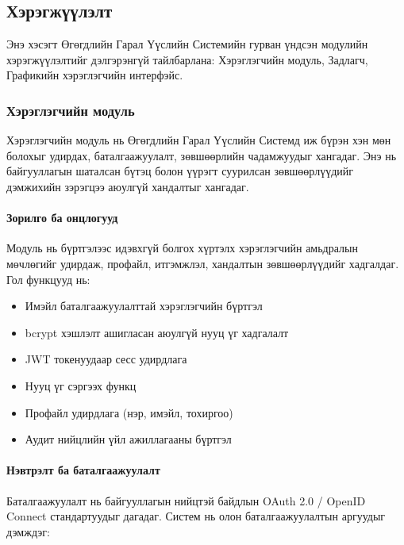 \subsection{Хэрэгжүүлэлт}
\label{subsec:dl_implementations}

Энэ хэсэгт Өгөгдлийн Гарал Үүслийн Системийн гурван үндсэн модулийн хэрэгжүүлэлтийг дэлгэрэнгүй тайлбарлана: Хэрэглэгчийн модуль, Задлагч, Графикийн хэрэглэгчийн интерфэйс.

\subsubsection{Хэрэглэгчийн модуль}

Хэрэглэгчийн модуль нь Өгөгдлийн Гарал Үүслийн Системд иж бүрэн хэн мөн болохыг удирдах, баталгаажуулалт, зөвшөөрлийн чадамжуудыг хангадаг. Энэ нь байгууллагын шаталсан бүтэц болон үүрэгт суурилсан зөвшөөрлүүдийг дэмжихийн зэрэгцээ аюулгүй хандалтыг хангадаг.

\paragraph{Зорилго ба онцлогууд}
Модуль нь бүртгэлээс идэвхгүй болгох хүртэлх хэрэглэгчийн амьдралын мөчлөгийг удирдаж, профайл, итгэмжлэл, хандалтын зөвшөөрлүүдийг хадгалдаг. Гол функцууд нь:

\begin{itemize}
    \item Имэйл баталгаажуулалттай хэрэглэгчийн бүртгэл
    \item bcrypt хэшлэлт ашигласан аюулгүй нууц үг хадгалалт
    \item JWT токенуудаар сесс удирдлага
    \item Нууц үг сэргээх функц
    \item Профайл удирдлага (нэр, имэйл, тохиргоо)
    \item Аудит нийцлийн үйл ажиллагааны бүртгэл
\end{itemize}

\paragraph{Нэвтрэлт ба баталгаажуулалт}
Баталгаажуулалт нь байгууллагын нийцтэй байдлын OAuth 2.0 / OpenID Connect стандартуудыг дагадаг. Систем нь олон баталгаажуулалтын аргуудыг дэмждэг:

